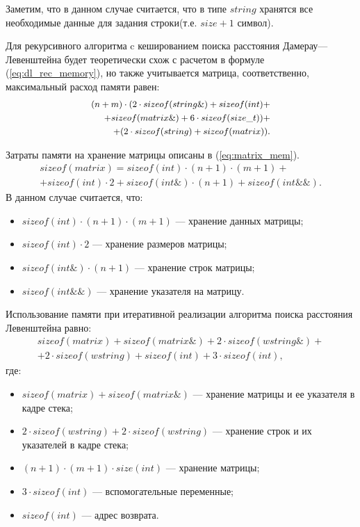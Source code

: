 Заметим, что в данном случае считается, что в типе $string$ хранятся все необходимые данные для задания строки(т.е. $size + 1$ символ).

Для рекурсивного алгоритма c кешированием поиска расстояния Дамерау---Левенштейна будет теоретически схож с расчетом в формуле (\ref{eq:dl_rec_memory}),
но также учитывается матрица, соответственно, максимальный расход памяти равен:
\begin{equation}
	\label{eq:dl_hash_memory}
    \small
	\begin{aligned}
		(n + m) \cdot (2 \cdot sizeof(string\&) + sizeof(int)+\\ +sizeof(matrix\&) + 6 \cdot sizeof(size\_t))+ \\
        + (2 \cdot sizeof(string) + sizeof(matrix)).
	\end{aligned}
\end{equation}

Затраты памяти на хранение матрицы описаны в  (\ref{eq:matrix_mem}).
\begin{equation}
	\label{eq:matrix_mem}
    \begin{aligned}
	sizeof(matrix) = sizeof(int) \cdot (n+1) \cdot (m + 1)+  \\
    + sizeof(int) \cdot 2 + sizeof(int\&) \cdot (n + 1) + sizeof(int\&\&).
    \end{aligned}
\end{equation}
В данном случае считается, что:
\begin{itemize}
	\item $sizeof(int) \cdot (n+1) \cdot (m + 1)$ --- хранение данных матрицы;
	\item $sizeof(int) \cdot 2$ --- хранение размеров матрицы;
	\item $sizeof(int\&) \cdot (n + 1)$ --- хранение строк матрицы;
	\item $sizeof(int\&\&)$ --- хранение указателя на матрицу.
\end{itemize}


Использование памяти при итеративной реализации алгоритма поиска расстояния Левенштейна  равно:
\begin{equation}
	\label{eq:lev_mtr_memory}
	\begin{aligned}
		sizeof(matrix) + sizeof(matrix\&) + 2 \cdot sizeof(wstring\&)+\\
        + 2 \cdot sizeof(wstring) + sizeof(int) + 3 \cdot sizeof(int),
	\end{aligned}
\end{equation}
где:
\begin{itemize}
	\item $sizeof(matrix) + sizeof(matrix\&)$ --- хранение матрицы и ее указателя в кадре стека;
	\item $2 \cdot sizeof(wstring) + 2 \cdot sizeof(wstring)$ --- хранение строк и их указателей в кадре стека;
	\item $(n + 1) \cdot (m + 1) \cdot size(int)$ --- хранение матрицы;
	\item $3 \cdot sizeof(int)$ --- вспомогательные переменные;
	\item $sizeof(int)$ --- адрес возврата.
\end{itemize}

